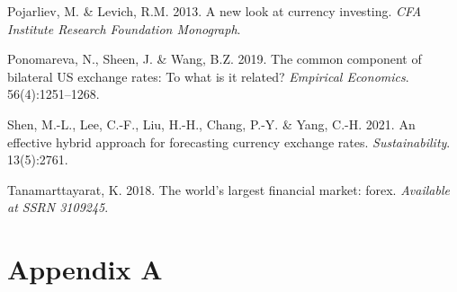 \documentclass[11pt,preprint, authoryear]{elsarticle}
\numberwithin{equation}{section}
\numberwithin{figure}{section}
\numberwithin{table}{section}
\newlength{\cslhangindent}
\newenvironment{CSLReferences}%
  {\setlength{\parindent}{0pt}%
  \everypar{\setlength{\hangindent}{\cslhangindent}}\ignorespaces}%
  {\par}
\begin{document}
\begin{CSLReferences}{1}{0}
\leavevmode{}%
Pojarliev, M. \& Levich, R.M. 2013. A new look at currency investing.
\emph{CFA Institute Research Foundation Monograph}.

\leavevmode{}%
Ponomareva, N., Sheen, J. \& Wang, B.Z. 2019. The common component of
bilateral US exchange rates: To what is it related? \emph{Empirical
Economics}. 56(4):1251--1268.

\leavevmode{}%
Shen, M.-L., Lee, C.-F., Liu, H.-H., Chang, P.-Y. \& Yang, C.-H. 2021.
An effective hybrid approach for forecasting currency exchange rates.
\emph{Sustainability}. 13(5):2761.

\leavevmode{}%
Tanamarttayarat, K. 2018. The world's largest financial market: forex.
\emph{Available at SSRN 3109245}.

\end{CSLReferences}

\hypertarget{appendix-a}{%
\section*{Appendix A}\label{appendix-a}}
\end{document}
